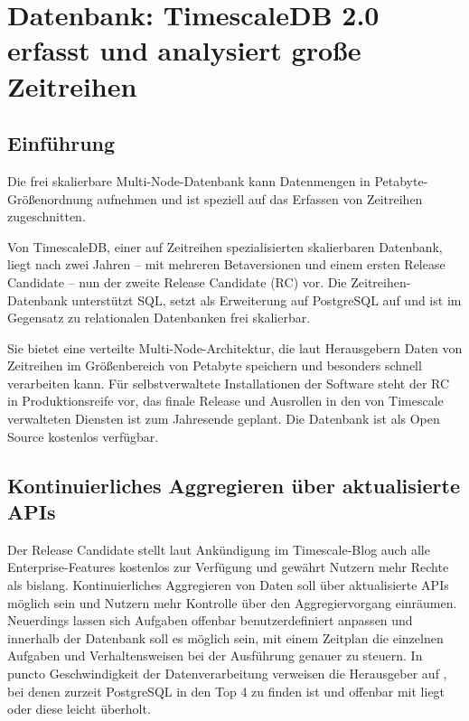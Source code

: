 %
%
%
%


%


\chapter{Datenbank: TimescaleDB 2.0 erfasst und analysiert große Zeitreihen}

\section{Einführung}


Die frei skalierbare Multi-Node-Datenbank kann Datenmengen in Petabyte-Größenordnung aufnehmen und ist speziell auf das Erfassen von Zeitreihen zugeschnitten.

Von TimescaleDB, einer auf Zeitreihen spezialisierten skalierbaren Datenbank, liegt nach zwei Jahren – mit mehreren Betaversionen und einem ersten Release Candidate – nun der zweite Release Candidate (RC) vor. Die Zeitreihen-Datenbank unterstützt SQL, setzt als Erweiterung auf PostgreSQL auf und ist im Gegensatz zu relationalen Datenbanken frei skalierbar.

Sie bietet eine verteilte Multi-Node-Architektur, die laut Herausgebern Daten von Zeitreihen im Größenbereich von Petabyte speichern und besonders schnell verarbeiten kann. Für selbstverwaltete Installationen der Software steht der RC in Produktionsreife vor, das finale Release und Ausrollen in den von Timescale verwalteten Diensten ist zum Jahresende geplant. Die Datenbank ist als Open Source kostenlos verfügbar.

\section{Kontinuierliches Aggregieren über aktualisierte APIs}


Der Release Candidate stellt laut Ankündigung im Timescale-Blog auch alle Enterprise-Features kostenlos zur Verfügung und gewährt Nutzern mehr Rechte als bislang. Kontinuierliches Aggregieren von Daten soll über aktualisierte APIs möglich sein und Nutzern mehr Kontrolle über den Aggregiervorgang einräumen. Neuerdings lassen sich Aufgaben offenbar benutzerdefiniert anpassen und innerhalb der Datenbank soll es möglich sein, mit einem Zeitplan die einzelnen Aufgaben und Verhaltensweisen bei der Ausführung genauer zu steuern. In puncto Geschwindigkeit der Datenverarbeitung verweisen die Herausgeber auf , bei denen zurzeit PostgreSQL in den Top 4 zu finden ist und offenbar mit  liegt oder diese leicht überholt.
	
